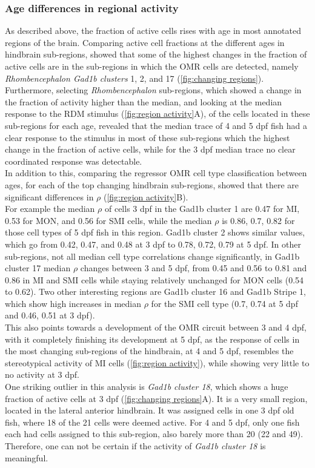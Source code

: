 \documentclass[12pt, a4paper, oneside]{article}
\begin{document}
\subsubsection{Age differences in regional activity}
\label{sec:region diff res}
As described above, the fraction of active cells rises with age in most annotated regions of the brain. Comparing active cell fractions at the different ages in hindbrain sub-regions, showed that some of the highest changes in the fraction of active cells are in the sub-regions in which the OMR cells are detected, namely \textit{Rhombencephalon Gad1b clusters} 1, 2, and 17 \parencite{bahlNeuralCircuitsEvidence2020} (\autoref{fig:changing regions}).
Furthermore, selecting \textit{Rhombencephalon} sub-regions, which showed a change in the fraction of activity higher than the median, and looking at the median response to the RDM stimulus (\autoref{fig:region activity}A), of the cells located in these sub-regions for each age, revealed that the median trace of 4 and 5 dpf fish had a clear response to the stimulus in most of these sub-regions which the highest change in the fraction of active cells, while for the 3 dpf median trace no clear coordinated response was detectable.\\
In addition to this, comparing the regressor OMR cell type classification between ages, for each of the top changing hindbrain sub-regions, showed that there are significant differences in $\rho$  (\autoref{fig:region activity}B).\\
For example the median $\rho$ of cells 3 dpf in the Gad1b cluster 1 are 0.47 for MI, 0.53 for MON, and 0.56 for SMI cells, while the median $\rho$ is 0.86, 0.7, 0.82 for those cell types of 5 dpf fish in this region. Gad1b cluster 2 shows similar values, which go from 0.42, 0.47, and 0.48 at 3 dpf to 0.78, 0.72, 0.79 at 5 dpf. In other sub-regions, not all median cell type correlations change significantly, in Gad1b cluster 17 median $\rho$ changes between 3 and 5 dpf, from 0.45 and 0.56 to 0.81 and 0.86 in MI and SMI cells while staying relatively unchanged for MON cells (0.54 to 0.62). Two other interesting regions are Gad1b cluster 16 and Gad1b Stripe 1, which show high increases in median $\rho$ for the SMI cell type (0.7, 0.74 at 5 dpf and 0.46, 0.51 at 3 dpf).\\
This also points towards a development of the OMR circuit between 3 and 4 dpf, with it completely finishing its development at 5 dpf, as the response of cells in the most changing sub-regions of the hindbrain, at 4 and 5 dpf, resembles the stereotypical activity of MI cells (\autoref{fig:region activity}), while showing very little to no activity at 3 dpf.\\
One striking outlier in this analysis is \textit{Gad1b cluster 18}, which shows a huge fraction of active cells at 3 dpf (\autoref{fig:changing regions}A). It is a very small region, located in the lateral anterior hindbrain. It was assigned cells in one 3 dpf old fish, where 18 of the 21 cells were deemed active. For 4 and 5 dpf, only one fish each had cells assigned to this sub-region, also barely more than 20 (22 and 49). Therefore, one can not be certain if the activity of \textit{Gad1b cluster 18} is meaningful.\\
\end{document}

